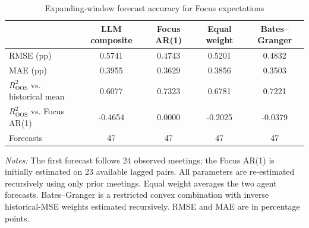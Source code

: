 \begin{table}[htbp]
\color{revisionred}
\centering
\begin{threeparttable}
\caption{Expanding-window forecast accuracy for Focus expectations}
\label{tab:llm-expanding}
\begin{scriptsize}
\setlength{\tabcolsep}{4.5pt}
\begin{tabular}{lcccc}
\toprule
 & LLM composite & Focus AR(1) & Equal weight & Bates--Granger \\
\midrule
RMSE (pp) & 0.5741 & 0.4743 & 0.5201 & 0.4832 \\
MAE (pp) & 0.3955 & 0.3629 & 0.3856 & 0.3503 \\
$R^2_{\mathrm{OOS}}$ vs. historical mean & 0.6077 & 0.7323 & 0.6781 & 0.7221 \\
$R^2_{\mathrm{OOS}}$ vs. Focus AR(1) & -0.4654 & 0.0000 & -0.2025 & -0.0379 \\
Forecasts & 47 & 47 & 47 & 47 \\
\bottomrule
\end{tabular}
\begin{tablenotes}[flushleft]
\scriptsize
\item \textit{Notes:} The first forecast follows 24 observed meetings; the Focus AR(1) is initially estimated on 23 available lagged pairs. All parameters are re-estimated recursively using only prior meetings. Equal weight averages the two agent forecasts. Bates--Granger is a restricted convex combination with inverse historical-MSE weights estimated recursively. RMSE and MAE are in percentage points.
\end{tablenotes}
\end{scriptsize}
\end{threeparttable}
\end{table}
